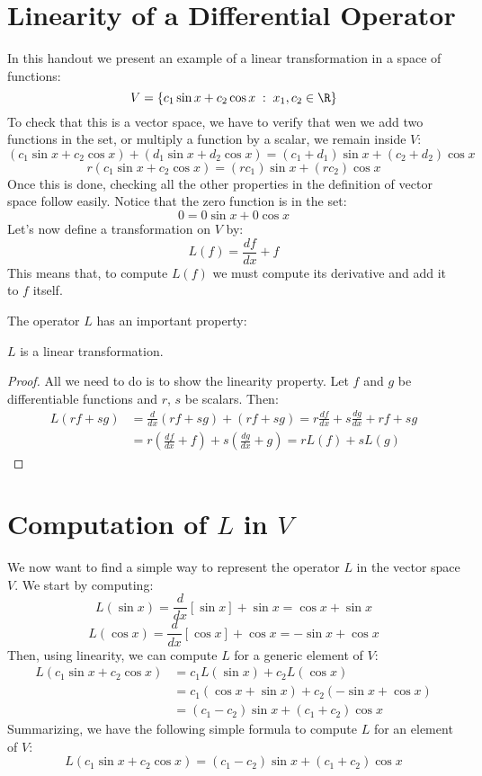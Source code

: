 \documentclass[12pt]{article}
\begin{document}
\section{Linearity of a Differential Operator}
In this handout we present an example of a linear transformation in a space of functions:
\[
V=\left\{c_1\sin x+c_2\cos x\;:\; x_1, c_2\in \R\right\}
\]
To check that this is a vector space, we have to verify that wen we add two functions in the set, or multiply a function by a scalar, we remain inside $V$:
\[
(c_1\sin x+c_2\cos x) + (d_1\sin x+d_2\cos x) = (c_1+d_1)\sin x+(c_2+d_2)\cos x
\]
\[
r(c_1\sin x+c_2\cos x)=(rc_1)\sin x+(rc_2)\cos x
\]
Once this is done, checking all the other properties in the definition of vector space follow easily. Notice that the zero function is in the set:
\[
0=0\sin x+ 0\cos x
\]
Let's now define a transformation on $V$ by:
\[
L(f)=\frac{df}{dx}+f
\]
This means that, to compute $L(f)$ we must compute its derivative and add it to $f$ itself.

The operator $L$ has an important property:

\begin{proposition} 
$L$ is a linear transformation.
\end{proposition}

\begin{proof} All we need to do is to show the linearity property. Let $f$ and $g$ be differentiable functions and $r$, $s$ be scalars. Then:
\begin{align*}
L(rf+sg)&=\frac{d}{dx}(rf+sg)+(rf+sg)=r\frac{df}{dx}+s\frac{dg}{dx}+rf+sg\\
&=r\left(\frac{df}{dx}+f\right)+s\left(\frac{dg}{dx}+g\right)=rL(f)+sL(g)
\end{align*}
\end{proof}

\section{Computation of $L$ in $V$}

We now want to find a simple way to represent the operator $L$ in the vector space $V$. We start by computing:
\[
L(\sin x)=\frac{d}{dx}[\sin x] + \sin x=\cos x + \sin x
\]
\[
L(\cos x)=\frac{d}{dx}[\cos x] + \cos x = -\sin x + \cos x
\]
Then, using linearity, we can compute $L$ for a generic element of $V$:
\begin{align*}
L(c_1\sin x + c_2\cos x)&=c_1 L(\sin x) + c_2 L(\cos x)\\
&=c_1(\cos x + \sin x)+c_2(-\sin x + \cos x)\\
&=(c_1-c_2)\sin x + (c_1+c_2) \cos x
\end{align*}
Summarizing, we have the following simple formula to compute $L$ for an element of $V$:
\[
L(c_1\sin x + c_2\cos x) = (c_1-c_2)\sin x + (c_1+c_2)\cos x
\]
\end{document}

